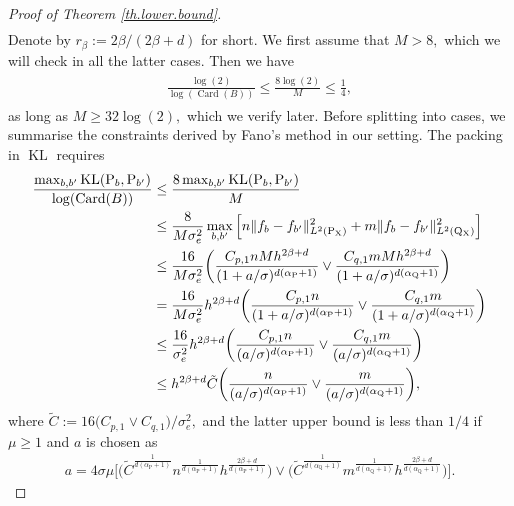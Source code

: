 \documentclass[10pt]{article}
\renewcommand{\P}{\operatorname{P}}
\newcommand{\Q}{\operatorname{Q}}
\newcommand{\card}{\operatorname{Card}}
\newcommand{\KL}{\operatorname{KL}}
\newcommand{\sX}{\mathrm{X}}
\begin{document}
\begin{proof}[Proof of Theorem \ref{th.lower.bound}]
\begin{align}
    \end{align}
    Denote by $r_{\beta} := 2\beta/(2\beta + d)$ for short. We first assume that $M > 8,$ which we will check in all the latter cases. Then we have
    \begin{align}
    \label{eq.bound.log2.fano.heavy.tail}
    \begin{split}
        \frac{\log(2)}{\log(\card(B))} \leq \frac{8\log(2)}{M} \leq \frac14,
    \end{split}
    \end{align}
    as long as $M \geq 32\log(2),$ which we verify later. Before splitting into cases, we summarise the constraints derived by Fano's method in our setting. The packing in $\KL$ requires
    \begin{align}
    \label{eq.KL.bound.heavy.tail}
    \begin{split}
        \frac{\max_{b, b'}\KL(\P_b, \P_{b'})}{\log(\card(B))} &\leq \frac{8\max_{b, b'}\KL(\P_b, \P_{b'})}{M}\\
        &\leq \frac{8}{M\sigma_e^2}\max_{b, b'}\Big[n\|f_b - f_{b'}\|_{L^2(\P_{\sX})}^2 + m\|f_b - f_{b'}\|_{L^2(\Q\mathstrut_{\!\sX})}^2\Big]\\
        &\leq \frac{16}{M\sigma_e^2} \bigg(\frac{C_{p, 1}nMh^{2\beta+d}}{(1 + a/\sigma)^{d(\alpha_{\P} + 1)}}\vee\frac{C_{q, 1}mMh^{2\beta+d}}{(1 + a/\sigma)^{d(\alpha_{\Q} + 1)}}\bigg)\\
        &= \frac{16}{M\sigma_e^2}h^{2\beta + d}\bigg(\frac{C_{p, 1}n}{(1 + a/\sigma)^{d(\alpha_{\P} + 1)}}\vee\frac{C_{q, 1}m}{(1 + a/\sigma)^{d(\alpha_{\Q} + 1)}}\bigg)\\
        &\leq \frac{16}{\sigma_e^2}h^{2\beta + d}\bigg(\frac{C_{p, 1}n}{(a/\sigma)^{d(\alpha_{\P} + 1)}}\vee\frac{C_{q, 1}m}{(a/\sigma)^{d(\alpha_{\Q} + 1)}}\bigg)\\
        &\leq h^{2\beta + d}\tilde C\bigg(\frac{n}{(a/\sigma)^{d(\alpha_{\P} + 1)}}\vee\frac{m}{(a/\sigma)^{d(\alpha_{\Q} + 1)}}\bigg),
    \end{split}
    \end{align}
    where $\tilde C := 16\big(C_{p, 1}\vee C_{q, 1}\big)/\sigma_e^2,$ and the latter upper bound is less than $1/4$ if $\mu\geq 1$ and $a$ is chosen as
    \begin{align}
        \label{eq.fano.support.diameter}
        a = 4\sigma\mu\bigg[\Big(\tilde C^{\tfrac{1}{d(\alpha_{\P} + 1)}}n^{\tfrac{1}{d(\alpha_{\P} + 1)}}h^{\tfrac{2\beta + d}{d(\alpha_{\P} + 1)}}\Big)\vee \Big(\tilde C^{\tfrac{1}{d(\alpha_{\Q} + 1)}}m^{\tfrac{1}{d(\alpha_{\Q} + 1)}}h^{\tfrac{2\beta + d}{d(\alpha_{\Q} + 1)}}\Big)\bigg].

\end{align}
\end{proof}
\end{document}
